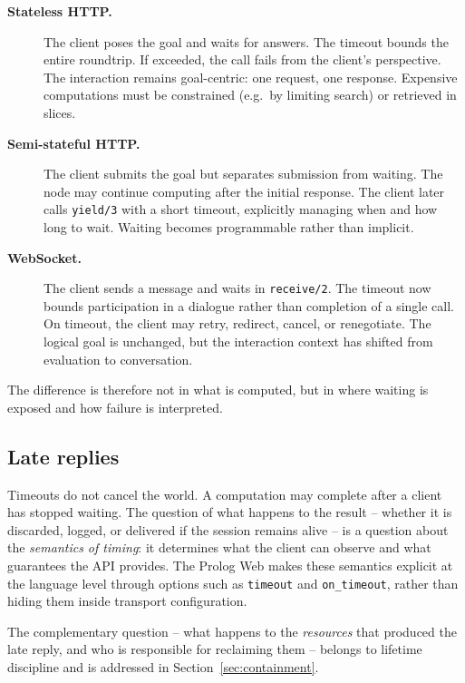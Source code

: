 \begin{description}

\item[\textbf{Stateless HTTP.}]
The client poses the goal and waits for answers. The timeout bounds
the entire roundtrip. If exceeded, the call fails from the client's
perspective. The interaction remains goal-centric: one request, one
response. Expensive computations must be constrained (e.g.\ by
limiting search) or retrieved in slices.

\item[\textbf{Semi-stateful HTTP.}]
The client submits the goal but separates submission from waiting.
The node may continue computing after the initial response. The
client later calls \texttt{yield/3} with a short timeout, explicitly
managing when and how long to wait. Waiting becomes programmable
rather than implicit.

\item[\textbf{WebSocket.}]
The client sends a message and waits in \texttt{receive/2}. The
timeout now bounds participation in a dialogue rather than completion
of a single call. On timeout, the client may retry, redirect,
cancel, or renegotiate. The logical goal is unchanged, but the
interaction context has shifted from evaluation to conversation.

\end{description}

\noindent The difference is therefore not in what is computed, but in
where waiting is exposed and how failure is interpreted.


\subsection{Late replies}

Timeouts do not cancel the world. A computation may complete after a
client has stopped waiting. The question of what happens to the
result -- whether it is discarded, logged, or delivered if the
session remains alive -- is a question about the \emph{semantics of
timing}: it determines what the client can observe and what
guarantees the API provides. The Prolog Web makes these semantics
explicit at the language level through options such as
\texttt{timeout} and \texttt{on\_timeout}, rather than hiding them
inside transport configuration.

The complementary question -- what happens to the \emph{resources}
that produced the late reply, and who is responsible for reclaiming
them -- belongs to lifetime discipline and is addressed in
Section~\ref{sec:containment}.



